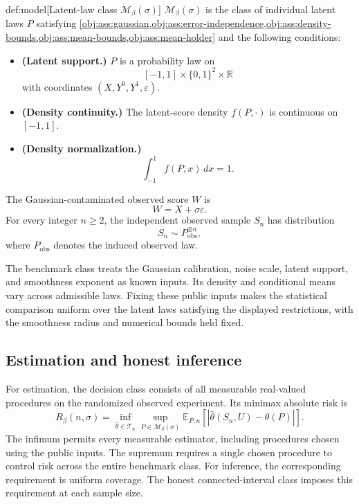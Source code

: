 \begin{definitionv}{def:model}[Latent-law class \(\mathcal M_\beta(\sigma)\)]
\(\mathcal M_\beta(\sigma)\) is the class of individual latent laws \(P\) satisfying \cref{obj:ass:gaussian,obj:ass:error-independence,obj:ass:density-bounds,obj:ass:mean-bounds,obj:ass:mean-holder} and the following conditions:
\begin{itemize}
\item \textbf{(Latent support.)} \(P\) is a probability law on
\[
[-1,1]\times\{0,1\}^{2}\times\mathbb R
\]
with coordinates \((X,Y^0,Y^1,\varepsilon)\).
\item \textbf{(Density continuity.)} The latent-score density \(f(P,\cdot)\) is continuous on \([-1,1]\).
\item \textbf{(Density normalization.)}
\[
\int_{-1}^{1}f(P,x)\,dx=1.
\]
\end{itemize}
The Gaussian-contaminated observed score \(W\) is
\[
W=X+\sigma\varepsilon.
\]
For every integer \(n\ge2\), the independent observed sample \(S_n\) has distribution
\[
S_n\sim P_{\mathrm{obs}}^{\otimes n},
\]
where \(P_{\mathrm{obs}}\) denotes the induced observed law.
\end{definitionv}

The benchmark class  treats the Gaussian calibration, noise scale, latent support, and smoothness exponent as known inputs. Its density and conditional means vary across admissible laws. Fixing these public inputs makes the statistical comparison uniform over the latent laws satisfying the displayed restrictions, with the smoothness radius and numerical bounds held fixed.

\subsection{Estimation and honest inference}

For estimation, the decision class  consists of all measurable real-valued procedures on the randomized observed experiment. Its minimax absolute risk is
\[
R_\beta(n,\sigma)
=
\inf_{\widehat\theta\in\mathcal T_n}
\sup_{P\in\mathcal M_\beta(\sigma)}
\mathbb E_{P,n}\!\left[|\widehat\theta(S_n,U)-\theta(P)|\right].
\]
The infimum permits every measurable estimator, including procedures chosen using the public inputs. The supremum requires a single chosen procedure to control risk across the entire benchmark class. For inference, the corresponding requirement is uniform coverage. The honest connected-interval class  imposes this requirement at each sample size.

